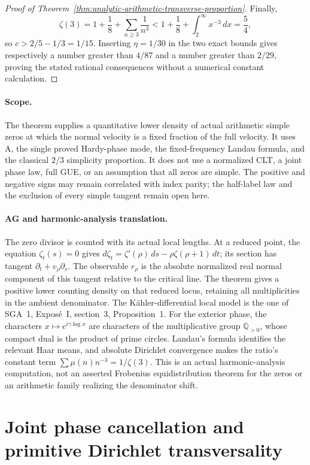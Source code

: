 \begin{proof}[Proof of Theorem~\ref{thm:analytic-arithmetic-transverse-proportion}]
Finally,
\[
 \zeta(3)=1+\frac18+\sum_{n\ge3}\frac1{n^3}
       <1+\frac18+\int_2^\infty x^{-3}\,dx=\frac54,
\]
so $c>2/5-1/3=1/15$. Inserting $\eta=1/30$ in the two
exact bounds gives respectively a number greater than
$4/87$ and a number greater than $2/29$, proving the stated
rational consequences without a numerical constant
calculation.
\end{proof}

\paragraph{Scope.}
The theorem supplies a quantitative lower density of actual
arithmetic simple zeros at which the normal velocity is a
fixed fraction of the full velocity. It uses A, the single
proved Hardy-phase mode, the fixed-frequency Landau formula,
and the classical $2/3$ simplicity proportion. It does not
use a normalized CLT, a joint phase law, full GUE, or an
assumption that all zeros are simple. The positive and
negative signs may remain correlated with index parity;
the half-label law and the exclusion of every simple tangent
remain open here.

\paragraph{AG and harmonic-analysis translation.}
The zero divisor is counted with its actual local lengths.
At a reduced point, the equation $\zeta_t(s)=0$ gives
$d\zeta_t=\zeta'(\rho)\,ds-\rho\zeta(\rho+1)\,dt$;
its section has tangent $\partial_t+v_\rho\partial_s$.
The observable $r_\rho$ is the absolute normalized real
normal component of this tangent relative to the critical
line. The theorem gives a positive lower counting density
on that reduced locus, retaining all multiplicities in the
ambient denominator. The K\"ahler-differential local model
is the one of SGA~1, Expos\'e~I, section~3, Proposition~1.
For the exterior phase, the characters $x\mapsto
e^{i\gamma\log x}$ are characters of the multiplicative
group $\mathbb Q_{>0}$, whose compact dual is the product
of prime circles. Landau's formula identifies the relevant
Haar means, and absolute Dirichlet convergence makes the
ratio's constant term $\sum\mu(n)n^{-3}=1/\zeta(3)$.
This is an actual harmonic-analysis computation, not an
asserted Frobenius equidistribution theorem for the zeros
or an arithmetic family realizing the denominator shift.


\section{Joint phase cancellation and primitive Dirichlet transversality}


